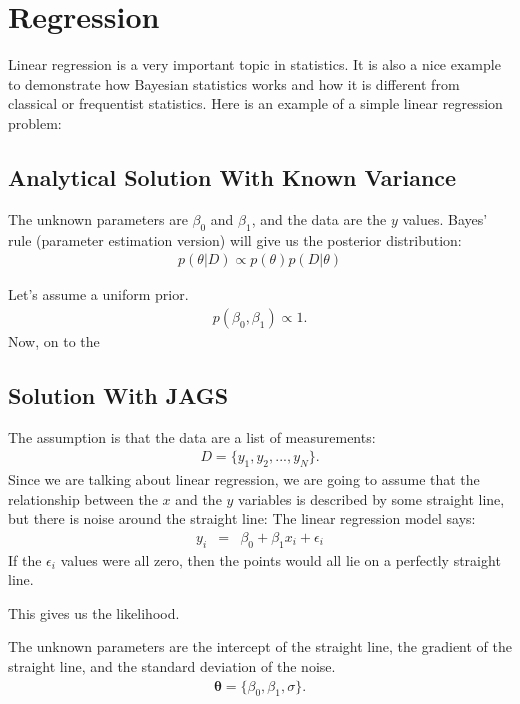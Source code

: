 \chapter{Regression}
Linear regression is a very important topic in statistics. It is also a nice
example to demonstrate how Bayesian statistics works and how it is different
from classical or frequentist statistics. Here is an example of a simple linear
regression problem:

\section{Analytical Solution With Known Variance}
The unknown parameters are $\beta_0$ and $\beta_1$, and the data are the
$y$ values. Bayes' rule (parameter estimation version) will give us the
posterior distribution:
\begin{eqnarray}
p(\theta|D) \propto p(\theta)p(D|\theta)
\end{eqnarray}


Let's assume a uniform prior.
\begin{eqnarray}
p(\beta_0, \beta_1) \propto 1.
\end{eqnarray}
Now, on to the 



\section{Solution With JAGS}
The assumption is that the data are a list of measurements:
\begin{eqnarray}
D = \{y_1, y_2, ..., y_N\}.
\end{eqnarray}
Since we are talking about linear regression, we are going to assume that the
relationship between the $x$ and the $y$ variables is described by some
straight line, but there is noise around the straight line:
The linear regression model says:
\begin{eqnarray}
y_i &=& \beta_0 + \beta_1 x_i + \epsilon_i
\end{eqnarray}
If the $\epsilon_i$ values were all zero, then the points would all lie on
a perfectly straight line.

This gives us the likelihood.

The unknown parameters are the intercept of the straight line, the gradient of
the straight line, and the standard deviation of the noise.
\begin{eqnarray}
\boldsymbol{\theta} = \{\beta_0, \beta_1, \sigma\}.
\end{eqnarray}

